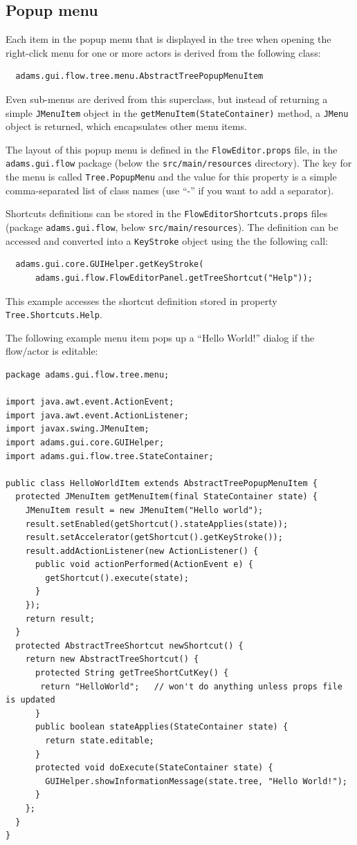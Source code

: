 \subsection{Popup menu}
\label{floweditor_popupmenu}
Each item in the popup menu that is displayed in the tree when opening the
right-click menu for one or more actors is derived from the following class:
\begin{verbatim}
  adams.gui.flow.tree.menu.AbstractTreePopupMenuItem
\end{verbatim}
Even sub-menus are derived from this superclass, but instead of returning a
simple \texttt{JMenuItem} object in the \texttt{getMenuItem(StateContainer)}
method, a \texttt{JMenu} object is returned, which encapsulates other menu
items.

The layout of this popup menu is defined in the \texttt{FlowEditor.props} file,
in the \texttt{adams.gui.flow} package (below the \texttt{src/main/resources}
directory). The key for the menu is called \texttt{Tree.PopupMenu} and the value
for this property is a simple comma-separated list of class names (use ``-''
if you want to add a separator).

Shortcuts definitions can be stored in the \texttt{FlowEditorShortcuts.props}
files (package \texttt{adams.gui.flow}, below \texttt{src/main/resources}). The
definition can be accessed and converted into a \texttt{KeyStroke} object using
the the following call:
\begin{verbatim}
  adams.gui.core.GUIHelper.getKeyStroke(
      adams.gui.flow.FlowEditorPanel.getTreeShortcut("Help"));
\end{verbatim}
This example accesses the shortcut definition stored in property
\texttt{Tree.Shortcuts.Help}.

The following example menu item pops up a ``Hello World!'' dialog if the
flow/actor is editable:
{\scriptsize
\begin{verbatim}
package adams.gui.flow.tree.menu;

import java.awt.event.ActionEvent;
import java.awt.event.ActionListener;
import javax.swing.JMenuItem;
import adams.gui.core.GUIHelper;
import adams.gui.flow.tree.StateContainer;

public class HelloWorldItem extends AbstractTreePopupMenuItem {
  protected JMenuItem getMenuItem(final StateContainer state) {
    JMenuItem result = new JMenuItem("Hello world");
    result.setEnabled(getShortcut().stateApplies(state));
    result.setAccelerator(getShortcut().getKeyStroke());
    result.addActionListener(new ActionListener() {
      public void actionPerformed(ActionEvent e) {
        getShortcut().execute(state);
      }
    });
    return result;
  }
  protected AbstractTreeShortcut newShortcut() {
    return new AbstractTreeShortcut() {
      protected String getTreeShortCutKey() {
 	   return "HelloWorld";   // won't do anything unless props file is updated
      }
      public boolean stateApplies(StateContainer state) {
        return state.editable;
      }
      protected void doExecute(StateContainer state) {
        GUIHelper.showInformationMessage(state.tree, "Hello World!");
      }
    };
  }
}
\end{verbatim}
}

